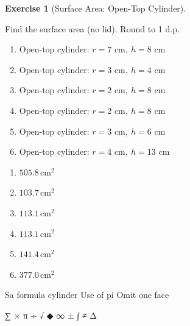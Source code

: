 \documentclass[
  letterpaper,
  DIV=11,
  numbers=noendperiod]{scrreprt}
\theoremstyle{definition}
\newtheorem{exercise}{Exercise}[chapter]
\theoremstyle{remark}
\begin{document}
\begin{exercise}[Surface Area: Open-Top
Cylinder]\protect\hypertarget{exr-sa-7}{}\label{exr-sa-7}

Find the surface area (no lid). Round to 1 d.p.

\begin{enumerate}
\def\labelenumi{\alph{enumi})}
\item
  \(\text{Open-top cylinder: }r=7\text{ cm},\ h=8\text{ cm}\)
\item
  \(\text{Open-top cylinder: }r=3\text{ cm},\ h=4\text{ cm}\)
\item
  \(\text{Open-top cylinder: }r=2\text{ cm},\ h=8\text{ cm}\)
\item
  \(\text{Open-top cylinder: }r=2\text{ cm},\ h=8\text{ cm}\)
\item
  \(\text{Open-top cylinder: }r=3\text{ cm},\ h=6\text{ cm}\)
\item
  \(\text{Open-top cylinder: }r=4\text{ cm},\ h=13\text{ cm}\)
\end{enumerate}

\begin{tcolorbox}[enhanced jigsaw, opacitybacktitle=0.6, coltitle=black, arc=.35mm, colframe=quarto-callout-tip-color-frame, colback=white, bottomrule=.15mm, left=2mm, colbacktitle=quarto-callout-tip-color!10!white, titlerule=0mm, opacityback=0, title=\textcolor{quarto-callout-tip-color}{\faLightbulb}\hspace{0.5em}{🔍 View Solution}, leftrule=.75mm, breakable, rightrule=.15mm, bottomtitle=1mm, toptitle=1mm, toprule=.15mm]

\begin{enumerate}
\def\labelenumi{\alph{enumi})}
\item
  \(505.8\,\text{cm}^{2}\)
\item
  \(103.7\,\text{cm}^{2}\)
\item
  \(113.1\,\text{cm}^{2}\)
\item
  \(113.1\,\text{cm}^{2}\)
\item
  \(141.4\,\text{cm}^{2}\)
\item
  \(377.0\,\text{cm}^{2}\)
\end{enumerate}

\end{tcolorbox}

{Sa formula cylinder} {Use of pi} {Omit one face}

\end{exercise}

∑ × π ÷ √ ◆ ∞ ± ∫ ≠ Δ
\end{document}
